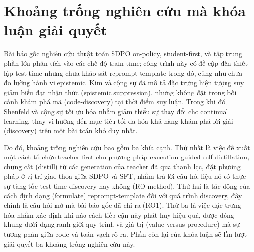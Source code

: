 \section{Khoảng trống nghiên cứu mà khóa luận giải quyết}\label{the-gap-this-thesis-addresses}

Bài báo gốc nghiên cứu thuật toán SDPO on-policy, student-first, và tập trung phần lớn phân tích vào các chế độ train-time; công trình này có đề cập đến thiết lập test-time nhưng chưa khảo sát reprompt template trong đó, cũng như chưa đo lường hành vi epistemic. Kim và cộng sự đã mô tả đặc trưng hiện tượng suy giảm biểu đạt nhận thức (epistemic suppression), nhưng không đặt trong bối cảnh khám phá mã (code-discovery) tại thời điểm suy luận. Trong khi đó, Shenfeld và cộng sự tối ưu hóa nhằm giảm thiểu sự thay đổi cho continual learning, thay vì hướng đến mục tiêu tối đa hóa khả năng khám phá lời giải (discovery) trên một bài toán khó duy nhất.

Do đó, khoảng trống nghiên cứu bao gồm ba khía cạnh. Thứ nhất là việc đề xuất một cách tổ chức teacher-first cho phương pháp execution-guided self-distillation, chưng cất (distill) từ các generation của teacher đã qua thanh lọc, đặt phương pháp ở vị trí giao thoa giữa SDPO và SFT, nhằm trả lời câu hỏi liệu nó có thực sự tăng tốc test-time discovery hay không (RO-method). Thứ hai là tác động của cách định dạng (formulate) reprompt-template đối với quá trình discovery, đây chính là câu hỏi mở mà bài báo gốc đã chỉ ra (RO1). Thứ ba là việc đặc trưng hóa nhằm xác định khi nào cách tiếp cận này phát huy hiệu quả, được đóng khung dưới dạng ranh giới quy trình-và-giá trị (value-versus-procedure) mà sự tương phản giữa code-và-toán vạch rõ ra. Phần còn lại của khóa luận sẽ lần lượt giải quyết ba khoảng trống nghiên cứu này.
